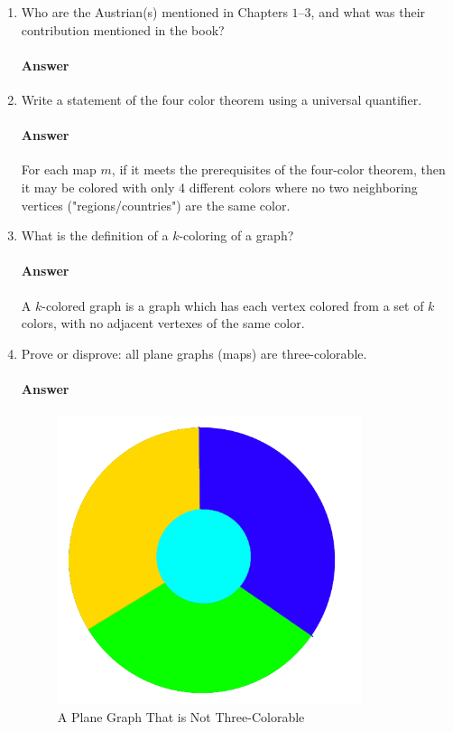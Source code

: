 \documentclass{article}
\begin{document}
\begin{enumerate}

    \item Who are the Austrian(s) mentioned in Chapters $1$--$3$, and what was their
        contribution mentioned in the book?

        \paragraph{Answer}

    \item Write a statement of the four color theorem using a universal
        quantifier.

        \paragraph{Answer}
        For each map $m$, if it meets the prerequisites of the four-color theorem, then it may be colored with only 4 different colors where no two neighboring vertices ("regions/countries") are the same color.

    \item What is the definition of a $k$-coloring of a graph?

        \paragraph{Answer}
        A $k$-colored graph is a graph which has each vertex colored from a set of $k$ colors, with no adjacent vertexes of the same color.

    \item Prove or disprove: all plane graphs (maps) are three-colorable.

        \paragraph{Answer}
        \begin{figure}[h]
            \centering
            \includegraphics[width=3.5in]{3map}
            \caption{A Plane Graph That is Not Three-Colorable}\label{fig:4-color map}
        \end{figure}


\end{enumerate}
\end{document}
